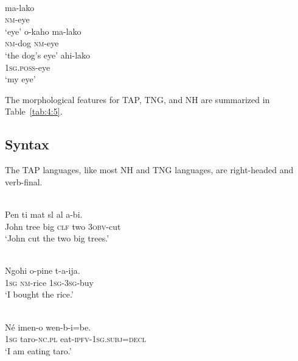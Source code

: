 \ea%
\label{ex:4:24}
 \\
\ea
  \gll ma-lako \\
    \textsc{nm}-eye  \\
\glt `eye' 
    \ex
    \gll o-kaho ma-lako \\
    \textsc{nm}-dog \textsc{nm}-eye\\
\glt `the dog's eye'
    \ex
    \gll ahi-lako\\
    \textsc{1sg.poss}-eye\\
\glt `my eye'
  \z
\z

The morphological features for TAP, TNG, and NH are summarized in Table~\ref{tab:4:5}.\enlargethispage{1em}




\subsection{Syntax} \label{sec:4:2.3}
The TAP languages, like most NH and TNG \citep{Foley2000} languages, are right-headed and verb-final.


\ea%
\label{ex:4:25}
 \\
\gll  Pen ti mat{\textepsilon} s{\textepsilon}l al{\textopeno} {\textglotstop}a-b{\textopeno}{\textglotstop}{\textopeno}i. \\
   John tree big \textsc{clf} two 3\textsc{obv}-cut \\
\glt `John cut the two big trees.'
\z





\ea%
\label{ex:4:26}
 \\
\gll  Ngohi o-pine t-a-ija. \\
 \textsc{1sg} \textsc{nm}-rice \textsc{1sg-3sg}-buy  \\
\glt `I bought the rice.'
\z






\ea%
\label{ex:4:27}
 \\
\gll  N\'e imen-o wen-b-i=be. \\
 \textsc{1sg} taro-\textsc{nc.pl} eat-\textsc{ipfv-1sg.subj=decl}  \\
\glt `I am eating taro.'
\z





